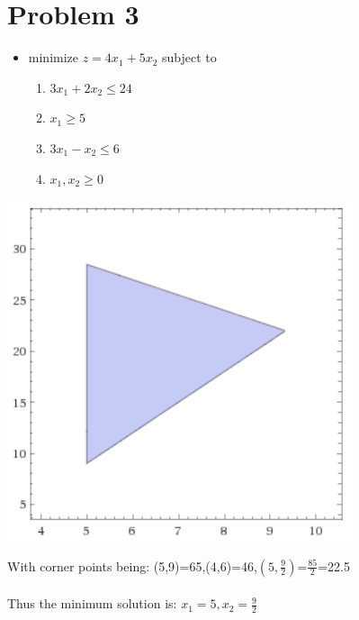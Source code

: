 \documentclass[11pt,a4paper,openany]{report}
\begin{document}
\section*{Problem 3}
\begin{itemize}
  \item minimize \(z=4x_1+5x_2\) subject to
  \begin{enumerate}
    \item \(3x_1+2x_2\leq24\)
    \item \(x_1\geq5\)
    \item \(3x_1-x_2\leq6\)
    \item \(x_1,x_2\geq0\)
  \end{enumerate}
\end{itemize}
\begin{center}
  \includegraphics[height=10cm]{images/p3_1}
\end{center}
With corner points being: (5,9)=65,(4,6)=46,\((5,\frac{9}{2})\)=\(\frac{85}{2}\)=22.5\\\\
Thus the minimum solution is: \(x_1=5,x_2=\frac{9}{2}\)

\newpage
\end{document}
